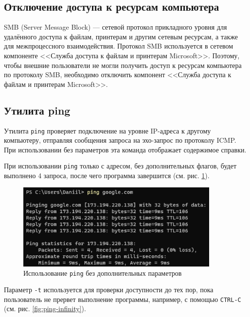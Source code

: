 \documentclass[a4paper, 14pt]{extarticle}
\begin{document}
\subsection{Отключение доступа к ресурсам компьютера}

SMB (Server Message Block) — сетевой протокол прикладного уровня для удалённого
доступа к файлам, принтерам и другим сетевым ресурсам, а также для
межпроцессного взаимодействия. Протокол SMB используется в сетевом компоненте
<<Служба доступа к файлам и принтерам Microsoft>>. Поэтому, чтобы внешние
пользователи не могли получить доступ к ресурсам компьютера по протоколу SMB,
необходимо отключить компонент <<Служба доступа к файлам и принтерам
Microsoft>>.

\subsection{Утилита ping}

Утилита \texttt{ping} проверяет подключение на уровне IP-адреса к другому
компьютеру, отправляя сообщения запроса на эхо-запрос по протоколу ICMP. При
использовании без параметров эта команда отображает содержимое справки.

При использовании \texttt{ping} только с адресом, без дополнительных флагов,
будет выполнено 4 запроса, после чего программа завершится (см. рис.
\ref{fig:ping-default}).

\begin{figure}[H]
  \centering
  \includegraphics[width=0.9\textwidth]{images/ping/default.png}
  \caption{Использование \texttt{ping} без дополнительных параметров}
  \label{fig:ping-default}
\end{figure}

Параметр \texttt{-t} используется для проверки доступности до тех пор, пока
пользователь не прервет выполнение программы, например, с помощью
\texttt{CTRL-C} (см. рис. \ref{fig:ping-infinity}).
\end{document}
